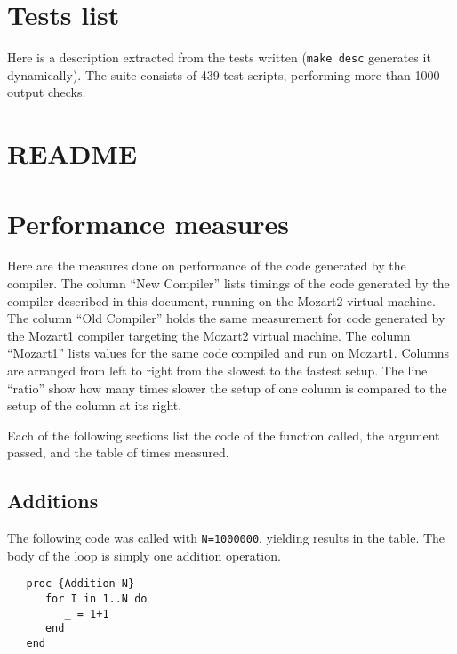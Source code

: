\documentclass[a4paper]{memoir}
\begin{document}
\begin{appendices}
\chapter{Tests list}
Here is a description extracted from the tests written (\lstinline!make desc!
generates it dynamically).
The suite consists of 439 test scripts, performing more than 1000 output
checks.



\chapter{README}\label{appendix:readme}

\chapter{Performance measures}\label{appendix:performance}
Here are the measures done on performance of the code generated by the compiler.
The column ``New Compiler'' lists timings of the code generated by the compiler
described in this document, running on the Mozart2 virtual machine. The column ``Old
Compiler'' holds the same measurement for code generated by the Mozart1 compiler
targeting the Mozart2 virtual machine. The column ``Mozart1'' lists values for
the same code compiled and run on Mozart1.
Columns are arranged from left to right from the slowest to the fastest setup.
The line ``ratio'' show how many times slower the setup of one column is
compared to the setup of the column at its right.

Each of the following sections list the code of the function called, the
argument passed, and the table of times measured.

\section{Additions}


The following code was called with \lstinline!N=1000000!, yielding results in
the table. The body of the loop is simply one addition operation.

\begin{lstlisting}
   proc {Addition N}
      for I in 1..N do
         _ = 1+1
      end
   end
\end{lstlisting}


\end{appendices}
\end{document}
